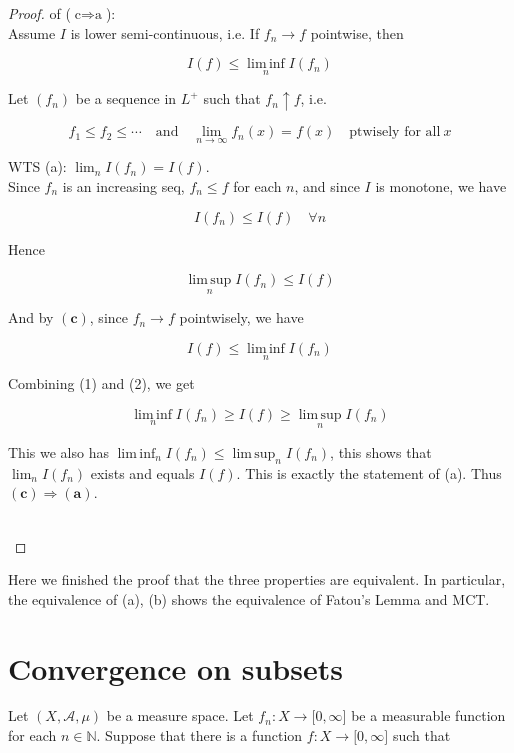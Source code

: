 \documentclass{qlnotes-export}
\begin{document}
\begin{proof}

of (\(\text{c}\Longrightarrow\text{a}\)):\\
Assume \(I\) is lower semi-continuous, i.e. If \(f_{n}\rightarrow f\) pointwise, then

\[I(f) \leq \operatorname{lim\, inf}\limits_{n}I(f_{n})\]

Let \((f_{n})\) be a sequence in \(L^{+}\) such that \(f_{n} \uparrow f\), i.e.

\[f_{1} \leq f_{2} \leq \cdots\quad\text{and}\quad\lim\limits_{n\rightarrow\infty}f_{n}(x) = f(x)\quad\text{ptwisely for all}\ x\]

WTS (a): \(\lim_{n}I(f_{n}) = I(f)\).\\
Since \(f_{n}\) is an increasing seq, \(f_{n} \leq f\) for each \(n\), and since \(I\) is monotone, we have

\[I(f_{n}) \leq I(f)\quad\forall n\]

Hence

\[\operatorname{lim\, sup}\limits_{n}I(f_{n}) \leq I(f)\]

And by \((\mathbf{c})\), since \(f_{n}\rightarrow f\) pointwisely, we have

\[I(f) \leq \operatorname{lim\, inf}\limits_{n}I(f_{n})\]

Combining (1) and (2), we get

\[\operatorname{lim\, inf}\limits_{n}I(f_{n}) \geq I(f) \geq \operatorname{lim\, sup}\limits_{n}I(f_{n})\]

This we also has \(\operatorname{lim\, inf}_{n}I(f_{n}) \leq \operatorname{lim\, sup}_{n}I(f_{n})\), this shows that \(\lim_{n}I(f_{n})\) exists and equals \(I(f)\). This is exactly the statement of (a). Thus \((\mathbf{c})\Longrightarrow(\mathbf{a})\).\\
\strut \\

\end{proof}

Here we finished the proof that the three properties are equivalent. In particular, the equivalence of (a), (b) shows the equivalence of Fatou's Lemma and MCT.

\section{Convergence on subsets}\label{convergence-on-subsets}

Let \((X,\mathcal{A},\mu)\) be a measure space. Let \(f_{n}:X\rightarrow\lbrack 0,\infty\rbrack\) be a measurable function for each \(n \in {\mathbb{N}}\). Suppose that there is a function \(f:X\rightarrow\lbrack 0,\infty\rbrack\) such that
\end{document}
